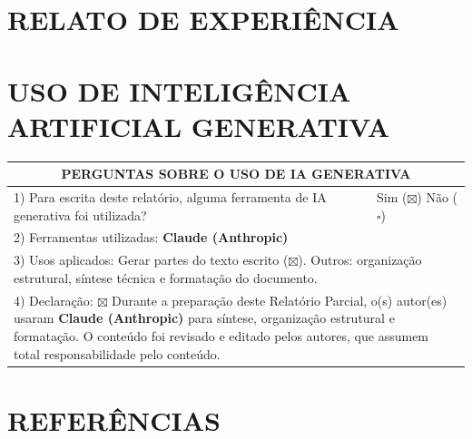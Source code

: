 \documentclass[12pt,a4paper]{article}
\begin{document}
\section{RELATO DE EXPERIÊNCIA}



\section{USO DE INTELIGÊNCIA ARTIFICIAL GENERATIVA}

\renewcommand{\arraystretch}{1.4}
\begin{table}[H]
\centering
\small
\begin{tabularx}{\textwidth}{|X|l|}
\hline
\multicolumn{2}{|c|}{\textbf{PERGUNTAS SOBRE O USO DE IA GENERATIVA}} \\
\hline
1) Para escrita deste relatório, alguma ferramenta de IA generativa foi utilizada? & Sim ($\boxtimes$) \hspace{0.3cm} Não ($\square$) \\
\hline
\multicolumn{2}{|p{\dimexpr\textwidth-2\tabcolsep-2\arrayrulewidth}|}{2) Ferramentas utilizadas: \textbf{Claude (Anthropic)}} \\
\hline
\multicolumn{2}{|p{\dimexpr\textwidth-2\tabcolsep-2\arrayrulewidth}|}{3) Usos aplicados: Gerar partes do texto escrito ($\boxtimes$). Outros: organização estrutural, síntese técnica e formatação do documento.} \\
\hline
\multicolumn{2}{|p{\dimexpr\textwidth-2\tabcolsep-2\arrayrulewidth}|}{4) Declaração: $\boxtimes$ Durante a preparação deste Relatório Parcial, o(s) autor(es) usaram \textbf{Claude (Anthropic)} para síntese, organização estrutural e formatação. O conteúdo foi revisado e editado pelos autores, que assumem total responsabilidade pelo conteúdo.} \\
\hline
\end{tabularx}
\end{table}

\section{REFERÊNCIAS}
\end{document}
